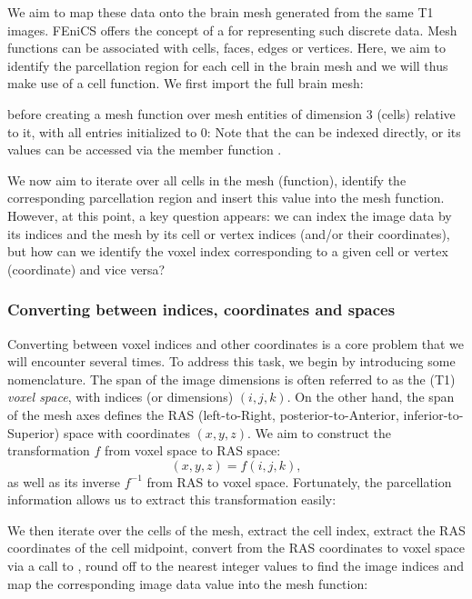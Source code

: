 We aim to map these data onto the brain mesh generated from the same
T1 images. FEniCS offers the concept of a  for
representing such discrete data. Mesh functions can be associated with
cells, faces, edges or vertices. Here, we aim to identify the
parcellation region for each cell in the brain mesh and we will thus
make use of a cell function. We first import the full brain mesh:

\noindent before creating a mesh function over mesh entities of
dimension 3 (cells) relative to it, with all entries initialized to 0:
Note that the  can be indexed directly, or its values can be
accessed via the member function .

We now aim to iterate over all cells in the mesh (function), identify the
corresponding parcellation region and insert this value into the 
mesh function. However, at this point, a key question appears: we can
index the image data by its indices and the mesh by its cell or vertex
indices (and/or their coordinates), but how can we identify the voxel
index corresponding to a given cell or vertex (coordinate) and vice
versa? 

\subsubsection*{Converting between indices, coordinates and spaces}

Converting between voxel indices and other coordinates is a core
problem that we will encounter several times. To address this task, we
begin by introducing some nomenclature. The span of the image
dimensions is often referred to as the (T1) \emph{voxel space}, with
indices (or dimensions) $(i, j, k)$. On the other hand, the span of
the mesh axes defines the RAS (left-to-Right, posterior-to-Anterior,
inferior-to-Superior) space with coordinates $(x, y, z)$. We aim to
construct the transformation $f$ from voxel space to RAS space:
\begin{equation}
  (x, y, z) = f(i, j, k),
\end{equation}
as well as its inverse $f^{-1}$ from RAS to voxel space. Fortunately,
the parcellation information allows us to extract this transformation easily:

We then iterate over the cells of the mesh, extract the cell index,
extract the RAS coordinates of the cell midpoint, convert from the RAS
coordinates to voxel space via a call to , round
off to the nearest integer values to find the image indices and map
the corresponding image data value into the  mesh function:

